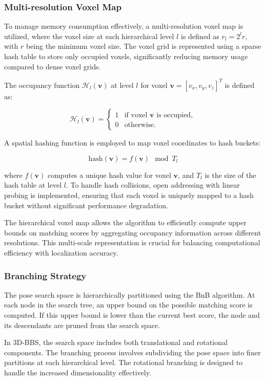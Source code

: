 \subsubsection{Multi-resolution Voxel Map}
To manage memory consumption effectively, a multi-resolution voxel map is utilized, where the voxel size at each hierarchical level $l$ is defined as $r_l = 2^l r$, with $r$ being the minimum voxel size. The voxel grid is represented using a sparse hash table to store only occupied voxels, significantly reducing memory usage compared to dense voxel grids.

The occupancy function $\mathcal{H}_l(\mathbf{v})$ at level $l$ for voxel $\mathbf{v} = [v_x, v_y, v_z]^T$ is defined as:

\begin{equation*}
\mathcal{H}_l(\mathbf{v}) = 
\begin{cases}
1 & \text{if voxel } \mathbf{v} \text{ is occupied}, \\
0 & \text{otherwise}.
\end{cases}
\end{equation*}

A spatial hashing function is employed to map voxel coordinates to hash buckets:

$$\text{hash}(\mathbf{v}) = f(\mathbf{v}) \mod T_l$$

where $f(\mathbf{v})$ computes a unique hash value for voxel $\mathbf{v}$, and $T_l$ is the size of the hash table at level $l$. To handle hash collisions, open addressing with linear probing is implemented, ensuring that each voxel is uniquely mapped to a hash bucket without significant performance degradation.

The hierarchical voxel map allows the algorithm to efficiently compute upper bounds on matching scores by aggregating occupancy information across different resolutions. This multi-scale representation is crucial for balancing computational efficiency with localization accuracy.

\subsubsection{Branching Strategy}
The pose search space is hierarchically partitioned using the BnB algorithm. At each node in the search tree, an upper bound on the possible matching score is computed. If this upper bound is lower than the current best score, the node and its descendants are pruned from the search space.

In 3D-BBS, the search space includes both translational and rotational components. The branching process involves subdividing the pose space into finer partitions at each hierarchical level. The rotational branching is designed to handle the increased dimensionality effectively.

